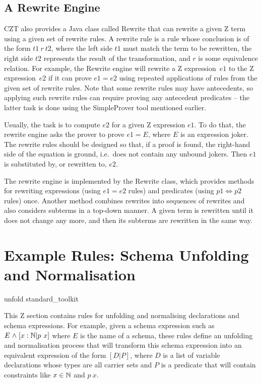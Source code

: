 \documentclass{entcs}
\begin{document}
\subsection{A Rewrite Engine} \label{sec:rewrite}

CZT also provides a Java class called Rewrite that can rewrite a given
Z term using a given set of rewrite rules.  A rewrite rule is a rule
whose conclusion is of the form $t1~r~t2$, where the left side $t1$
must match the term to be rewritten, the right side $t2$ represents
the result of the transformation, and $r$ is some equivalence
relation.  For example, the Rewrite engine will rewrite a Z
expression~$e1$ to the Z expression~$e2$ if it can prove $e1 = e2$
using repeated applications of rules from the given set of rewrite
rules.  Note that some rewrite rules may have antecedents, so applying
such rewrite rules can require proving any antecedent predicates --
the latter task is done using the SimpleProver tool mentioned earlier.

Usually, the task is to compute $e2$ for a given Z expression $e1$.
To do that, the rewrite engine asks the prover to prove $e1 = E$,
where $E$ is an expression joker.  The rewrite rules should be
designed so that, if a proof is found, the right-hand side of the
equation is ground, i.e.\ does not contain any unbound jokers.  Then
$e1$ is substituted by, or rewritten to, $e2$.

The rewrite engine is implemented by the Rewrite class, which provides
methods for rewriting expressions (using $e1 = e2$ rules) and
predicates (using $p1 \iff p2$ rules) once.  Another method combines
rewrites into sequences of rewrites and also considers subterms in a
top-down manner.  A given term is rewritten until it does not change
any more, and then its subterms are rewritten in the same way.

\section{Example Rules: Schema Unfolding and Normalisation} \label{sec:schemas}

\begin{zsection}
  \SECTION unfold \parents standard\_toolkit
\end{zsection}

This Z section contains rules for unfolding and normalising declarations
and schema expressions.  For example, given a schema expression such as $E
\mathrel{\mathstrut{\wedge}} [x:{\mathbb N} | p~x]$ where $E$ is the name of a schema, these rules define
an unfolding and normalisation process that will transform this schema
expression into an equivalent expression of the form $[D|P]$, where $D$ is
a list of variable declarations whose types are all carrier sets and $P$ is
a predicate that will contain constraints like $x \in {\mathbb N}$ and $p~x$.
\end{document}
